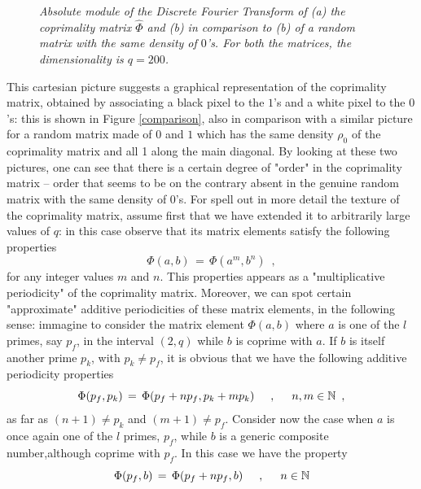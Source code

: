 \documentclass[aps,pra,superscriptaddress]{revtex4}
\newcommand\be            {\begin{equation}}
\newcommand\ee            {\end{equation}}
\renewcommand{\(}{\left(}
\renewcommand{\)}{\right)}
\renewcommand{\[}{\left[}
\renewcommand{\]}{\right]}
\begin{document}
\begin{figure}[t]
\caption{{\em  Absolute module of the Discrete Fourier Transform of (a) the coprimality matrix $\widehat\Phi$ and (b) in comparison to (b) of a random 
matrix with the same density of $0$'s. For both the matrices, the dimensionality is $q=200$.}}
\label{Fourier}
\end{figure}


This cartesian picture suggests a graphical representation of the coprimality matrix, obtained by associating a black pixel to the $1$'s and a white pixel to the $0$'s: this is shown in Figure \ref{comparison}, also in comparison with a similar picture for a random matrix made of $0$ and $1$ which has the same density $\rho_0$ of the coprimality matrix and all 1 along the main diagonal. By looking at these two pictures, one can see that there is a certain degree of "order" in the coprimality matrix -- order that seems to be on the contrary absent in the genuine random matrix with the same density of $0$'s. For spell out in more detail the texture of the coprimality matrix, assume first that we have extended it to arbitrarily large values of $q$: in this case observe that its matrix elements satisfy the following properties 
\be 
\Phi(a, b) \,=\,\Phi(a^m, b^n) \,\,\,,
\ee
for any integer values $m$ and $n$. This properties appears as a "multiplicative periodicity" of the coprimality matrix. Moreover, we can spot 
certain "approximate" additive periodicities of these matrix elements, in the following sense: immagine to consider the matrix element 
$\Phi(a,b)$ where $a$ is one of the $l$ primes, say $p_f$, in the interval $(2,q)$ while $b$ is coprime with $a$. If $b$ is itself 
another prime $p_k$, with $p_k \neq p_f$, it is obvious that we have the following additive periodicity properties 
\be 
\Phi(p_f, p_k) \,=\, \Phi(p_f + n p_f, p_k + m p_k)
\hspace{5mm}
,
\hspace{5mm}
n, m \in {\mathbb N} 
\,\,\,, 
\label{firstprimeperiodicity}
\ee
as far as $(n+1) \neq p_k$ and $(m+1) \neq p_f$. Consider now the case when $a$ is once again one of the $l$ primes, $p_f$, while 
$b$ is a generic composite number,although coprime with $p_f$. In this case we have the property 
\be
\Phi(p_f,b)\,=\, \Phi(p_f + n p_f, b) 
\hspace{5mm}
,
\hspace{5mm} 
n \in {\mathbb N}
\label{secondperiodicity}
\ee
\end{document}

